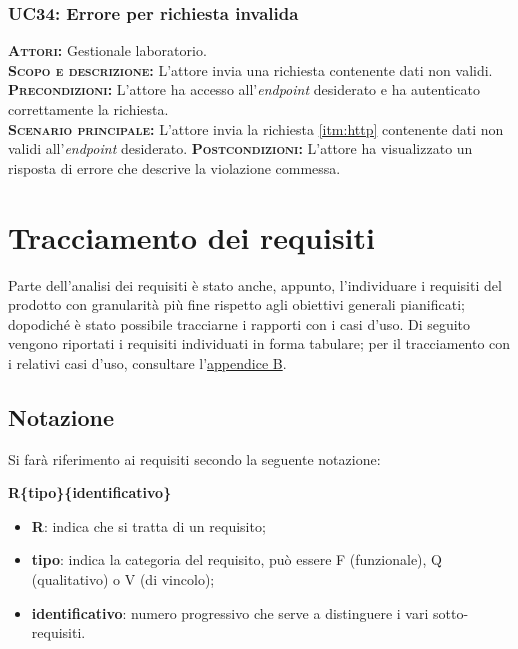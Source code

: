 \subsubsection{UC34: Errore per richiesta invalida}
\label{sec:UC34}
\textsc{\textbf{Attori:}} Gestionale laboratorio.\\
\textsc{\textbf{Scopo e descrizione:}} L'attore invia una richiesta contenente dati non validi.\\
\textsc{\textsc{\textbf{Precondizioni:}}} L'attore ha accesso all'\textit{endpoint} desiderato e ha autenticato correttamente la richiesta.\\
\textsc{\textbf{Scenario principale:}} L'attore invia la richiesta \ref{itm:http} contenente dati non validi all'\textit{endpoint} desiderato.
\textsc{\textbf{Postcondizioni:}} L'attore ha visualizzato un risposta di errore che descrive la violazione commessa.

\setlength{\parindent}{12pt}

\setlength{\parindent}{12pt}

\section{Tracciamento dei requisiti}
Parte dell'analisi dei requisiti è stato anche, appunto, l'individuare i requisiti del prodotto con granularità più fine rispetto agli obiettivi generali pianificati; dopodiché è stato possibile tracciarne i rapporti con i casi d'uso.
Di seguito vengono riportati i requisiti individuati in forma tabulare; per il tracciamento con i relativi casi d'uso, consultare l'\hyperref[sec:AppendixB]{appendice B}.
\subsection{Notazione}
Si farà riferimento ai requisiti secondo la seguente notazione:\\
\centerline{\textbf{R\{tipo\}\{identificativo\}}}
\begin{itemize}
    \item \textbf{R}: indica che si tratta di un requisito;
    \item \textbf{tipo}: indica la categoria del requisito, può essere F (funzionale), Q (qualitativo) o V (di vincolo);
    \item \textbf{identificativo}: numero progressivo che serve a distinguere i vari sotto-requisiti.
\end{itemize}
\vspace{-12pt}
